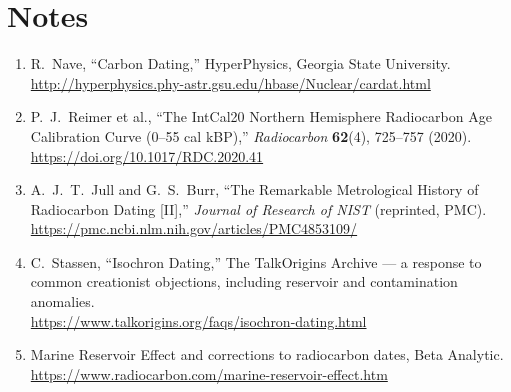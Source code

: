 \documentclass[11pt]{article}
\begin{document}
\section*{Notes}

\begin{enumerate}
    \item R.\ Nave, ``Carbon Dating,'' HyperPhysics, Georgia State University.\\
    \url{http://hyperphysics.phy-astr.gsu.edu/hbase/Nuclear/cardat.html}

    \item P.\ J.\ Reimer et al., ``The IntCal20 Northern Hemisphere Radiocarbon Age Calibration Curve (0--55 cal kBP),'' \emph{Radiocarbon} \textbf{62}(4), 725--757 (2020).\\
    \url{https://doi.org/10.1017/RDC.2020.41}

    \item A.\ J.\ T.\ Jull and G.\ S.\ Burr, ``The Remarkable Metrological History of Radiocarbon Dating [II],'' \emph{Journal of Research of NIST} (reprinted, PMC).\\
    \url{https://pmc.ncbi.nlm.nih.gov/articles/PMC4853109/}

    \item C.\ Stassen, ``Isochron Dating,'' The TalkOrigins Archive --- a response to common creationist objections, including reservoir and contamination anomalies.\\
    \url{https://www.talkorigins.org/faqs/isochron-dating.html}

    \item Marine Reservoir Effect and corrections to radiocarbon dates, Beta Analytic.\\
    \url{https://www.radiocarbon.com/marine-reservoir-effect.htm}
\end{enumerate}
\end{document}
